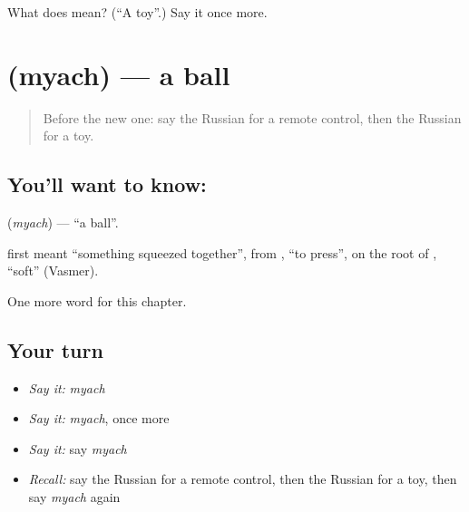 \begin{tcolorbox}[breakable,colback=teal!4,colframe=teal!35!black,title={Before you move on}]
What does  mean? (\textquotedblleft{}A toy\textquotedblright{}.) Say it once more.
\end{tcolorbox}
\section[\texorpdfstring{\ru{мяч} (myach)}{мяч (myach)}]{ (myach) — a ball}

\label{lesson:RU-C221-myach}



\begin{quote}
Before the new one: say the Russian for a remote control, then the Russian for a toy.
\end{quote}

\subsection*{You'll want to know: }
\textbf{} (\emph{myach}) — \textquotedblleft{}a ball\textquotedblright{}.

\begin{cousinweb}
\textbf{} first meant \textquotedblleft{}something squeezed together\textquotedblright{}, from \emph{}, \textquotedblleft{}to press\textquotedblright{}, on the root of \emph{}, \textquotedblleft{}soft\textquotedblright{} (Vasmer).
\end{cousinweb}

\begin{grammarlens}[title={What you've built}]
One more word for this chapter.
\end{grammarlens}

\subsection*{Your turn}
\begin{itemize}
\raggedright
  \item \emph{Say it:} \emph{myach}
  \item \emph{Say it:} \emph{myach}, once more
  \item \emph{Say it:} say \emph{myach}
  \item \emph{Recall:} say the Russian for a remote control, then the Russian for a toy, then say \emph{myach} again
\end{itemize}

